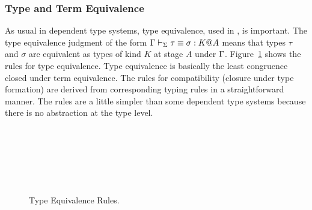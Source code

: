 \subsubsection{Type and Term Equivalence}

As usual in dependent type systems, type equivalence, used in \TConv,
is important.  The type equivalence judgment of the form
$\Gamma \vdash_\Sigma \tau \equiv \sigma : K @ A$ means that types $\tau$ and $\sigma$
are equivalent as types of kind $K$ at stage $A$ under $\Gamma$.
Figure~\ref{fig:type-equivalence-rules} shows the rules for type
equivalence.  Type equivalence is basically the least congruence
closed under term equivalence.  The rules for compatibility (closure
under type formation) are derived from corresponding typing rules in a
straightforward manner.  The rules are a little simpler than some
dependent type systems   because there is no abstraction
at the type level.


\begin{figure}
	\begin{center}
		 \\[2mm]
		 \\[2mm]
		\andalso
		 \\[2mm]
		 \\[2mm]
		 \andalso
		 \\[2mm]
		\caption{Type Equivalence Rules.}
		\label{fig:type-equivalence-rules}
	\end{center}
\end{figure}

